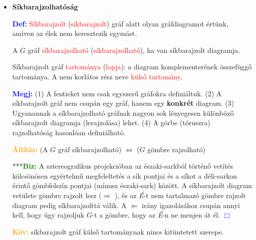 \documentclass[../../szobeli.tex]{subfiles}
\begin{document}
\begin{center}
    \noindent{}
\end{center}

    \begin{itemize}
        \item \textbf{Síkbarajzolhatóság}

        \textcolor{blue}{\textbf{Def:}} \textcolor{red}{Síkbarajzolt} (\textcolor{red}{síkbarajzolt}) gráf alatt olyan gráfdiagramot értünk, amiven az  élek nem keresztezik egymást.

        A $G$ gráf \textcolor{red}{síkbarajzolható} (\textcolor{red}{síkbarajzolható}), ha van síkbarajzolt diagramja. 

        Síkbarajzolt gráf \textcolor{red}{tartománya} (\textcolor{red}{lapja}): a diagram komplementerének összefüggő tartománya. A nem korlátos rész neve \textcolor{red}{külső tartomány}. 

        \textcolor{blue}{\textbf{Megj:}} (1) A fentieket nem csak egyszerű gráfokra definiáltuk. (2) A síkbarajzolt gráf nem csupán egy gráf, hanem egy \textbf{konkrét} diagram. (3) Ugyanannak a síkbarajzolható gráfnak nagyon sok lényegesen különböző síkbarajzolt diagramja (lerajzolása) lehet. (4) A görbe (tóruszra) rajzolhatóság hasonlóan definiálható.

        \textcolor{orange}{\textbf{Állítás:}} (A $G$ gráf síkbarajzolható) $\Longleftrightarrow$ ($G$ gömbre rajzolható) 

        ***\textcolor{green}{\textbf{Biz:}} A sztereografikus projekcióban az északi-sarkból történő vetítés kölcsönösen egyértelmű megfeleltetés a sík pontjai és a síkot a déli-sarkon érintő gömbfelszín pontjai (mínusz északi-sark) között. A síkbarajzolt diagram vetülete gömbre rajzolt lesz ($\Rightarrow$ \checkmark), és az \textit{É}-t nem tartalmazó gömbre rajzolt diagram pedig síkbarajzolttá válik. A $\Leftarrow$ irány igazolásához csupán annyi kell, hogy úgy rajzoljuk $G$-t a gömbre, hogy az \textit{É}-n ne menjen át él. \textcolor{blue}{$\Box$}

        \textcolor{orange}{\textbf{Köv:}} síkbarajzolt gráf külső tartománynak nincs kitüntetett szerepe.


\end{itemize}
\end{document}
